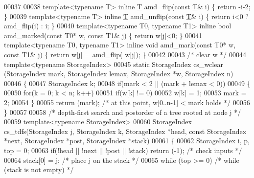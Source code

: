\begin{DoxyCode}
00037   
00038 \textcolor{keyword}{template}<\textcolor{keyword}{typename} T> \textcolor{keyword}{inline} \hyperlink{group___sparse_core___module_class_eigen_1_1_triplet}{T} amd\_flip(\textcolor{keyword}{const} \hyperlink{group___sparse_core___module_class_eigen_1_1_triplet}{T}& i) \{ \textcolor{keywordflow}{return} -i-2; \}
00039 \textcolor{keyword}{template}<\textcolor{keyword}{typename} T> \textcolor{keyword}{inline} \hyperlink{group___sparse_core___module_class_eigen_1_1_triplet}{T} amd\_unflip(\textcolor{keyword}{const} \hyperlink{group___sparse_core___module_class_eigen_1_1_triplet}{T}& i) \{ \textcolor{keywordflow}{return} i<0 ? amd\_flip(i) : i; \}
00040 \textcolor{keyword}{template}<\textcolor{keyword}{typename} T0, \textcolor{keyword}{typename} T1> \textcolor{keyword}{inline} \textcolor{keywordtype}{bool} amd\_marked(\textcolor{keyword}{const} T0* w, \textcolor{keyword}{const} T1& j) \{ \textcolor{keywordflow}{return} w[j]<0; \}
00041 \textcolor{keyword}{template}<\textcolor{keyword}{typename} T0, \textcolor{keyword}{typename} T1> \textcolor{keyword}{inline} \textcolor{keywordtype}{void} amd\_mark(\textcolor{keyword}{const} T0* w, \textcolor{keyword}{const} T1& j) \{ \textcolor{keywordflow}{return} w[j] = amd\_flip(
      w[j]); \}
00042 
00043 \textcolor{comment}{/* clear w */}
00044 \textcolor{keyword}{template}<\textcolor{keyword}{typename} StorageIndex>
00045 \textcolor{keyword}{static} StorageIndex cs\_wclear (StorageIndex mark, StorageIndex lemax, StorageIndex *w, StorageIndex n)
00046 \{
00047   StorageIndex k;
00048   \textcolor{keywordflow}{if}(mark < 2 || (mark + lemax < 0))
00049   \{
00050     \textcolor{keywordflow}{for}(k = 0; k < n; k++)
00051       \textcolor{keywordflow}{if}(w[k] != 0)
00052         w[k] = 1;
00053     mark = 2;
00054   \}
00055   \textcolor{keywordflow}{return} (mark);     \textcolor{comment}{/* at this point, w[0..n-1] < mark holds */}
00056 \}
00057 
00058 \textcolor{comment}{/* depth-first search and postorder of a tree rooted at node j */}
00059 \textcolor{keyword}{template}<\textcolor{keyword}{typename} StorageIndex>
00060 StorageIndex cs\_tdfs(StorageIndex j, StorageIndex k, StorageIndex *head, \textcolor{keyword}{const} StorageIndex *next, 
      StorageIndex *post, StorageIndex *stack)
00061 \{
00062   StorageIndex i, p, top = 0;
00063   \textcolor{keywordflow}{if}(!head || !next || !post || !stack) \textcolor{keywordflow}{return} (-1);    \textcolor{comment}{/* check inputs */}
00064   stack[0] = j;                 \textcolor{comment}{/* place j on the stack */}
00065   \textcolor{keywordflow}{while} (top >= 0)                \textcolor{comment}{/* while (stack is not empty) */}

\end{DoxyCode}
